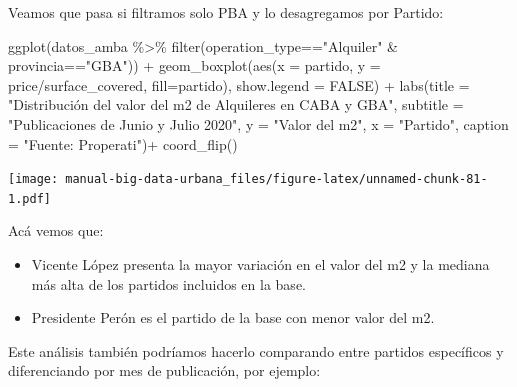 \documentclass[
  spanish,
]{book}
\newenvironment{Shaded}{\begin{snugshade}}{\end{snugshade}}
\newcommand{\AttributeTok}[1]{\textcolor[rgb]{0.77,0.63,0.00}{#1}}
\newcommand{\ConstantTok}[1]{\textcolor[rgb]{0.00,0.00,0.00}{#1}}
\newcommand{\FunctionTok}[1]{\textcolor[rgb]{0.00,0.00,0.00}{#1}}
\newcommand{\NormalTok}[1]{#1}
\newcommand{\SpecialCharTok}[1]{\textcolor[rgb]{0.00,0.00,0.00}{#1}}
\newcommand{\StringTok}[1]{\textcolor[rgb]{0.31,0.60,0.02}{#1}}
\providecommand{\tightlist}{%
  \setlength{\itemsep}{0pt}\setlength{\parskip}{0pt}}
\begin{document}
Veamos que pasa si filtramos solo PBA y lo desagregamos por Partido:

\begin{Shaded}
\begin{Highlighting}[]
\FunctionTok{ggplot}\NormalTok{(datos\_amba }\SpecialCharTok{\%\textgreater{}\%}
         \FunctionTok{filter}\NormalTok{(operation\_type}\SpecialCharTok{==}\StringTok{"Alquiler"} \SpecialCharTok{\&}\NormalTok{ provincia}\SpecialCharTok{==}\StringTok{"GBA"}\NormalTok{)) }\SpecialCharTok{+}
  \FunctionTok{geom\_boxplot}\NormalTok{(}\FunctionTok{aes}\NormalTok{(}\AttributeTok{x =}\NormalTok{ partido, }\AttributeTok{y =}\NormalTok{ price}\SpecialCharTok{/}\NormalTok{surface\_covered, }\AttributeTok{fill=}\NormalTok{partido), }\AttributeTok{show.legend =} \ConstantTok{FALSE}\NormalTok{) }\SpecialCharTok{+}
  \FunctionTok{labs}\NormalTok{(}\AttributeTok{title =} \StringTok{"Distribución del valor del m2 de Alquileres en CABA y GBA"}\NormalTok{,}
       \AttributeTok{subtitle =} \StringTok{"Publicaciones de Junio y Julio 2020"}\NormalTok{,}
       \AttributeTok{y =} \StringTok{"Valor del m2"}\NormalTok{,}
       \AttributeTok{x =} \StringTok{"Partido"}\NormalTok{,}
       \AttributeTok{caption =} \StringTok{"Fuente: Properati"}\NormalTok{)}\SpecialCharTok{+}
  \FunctionTok{coord\_flip}\NormalTok{()}
\end{Highlighting}
\end{Shaded}

\texttt{[image: manual-big-data-urbana\_files/figure-latex/unnamed-chunk-81-1.pdf]}

Acá vemos que:

\begin{itemize}
\tightlist
\item
  Vicente López presenta la mayor variación en el valor del m2 y la mediana más alta de los partidos incluidos en la base.
\item
  Presidente Perón es el partido de la base con menor valor del m2.
\end{itemize}

Este análisis también podríamos hacerlo comparando entre partidos específicos y diferenciando por mes de publicación, por ejemplo:
\end{document}

